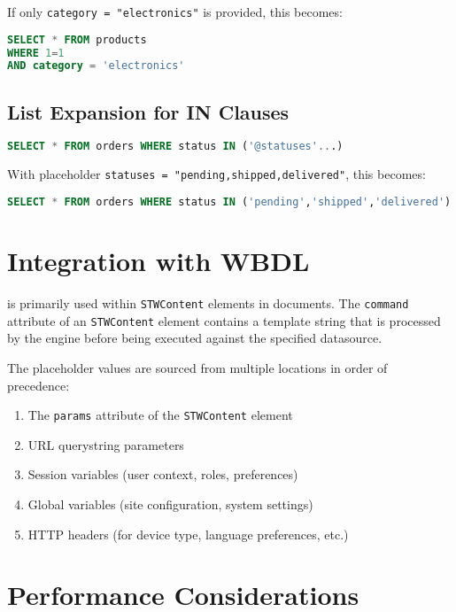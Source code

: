 If only \texttt{category = "electronics"} is provided, this becomes:
\begin{lstlisting}[language=SQL]
SELECT * FROM products 
WHERE 1=1 
AND category = 'electronics'
\end{lstlisting}

\subsection{List Expansion for IN Clauses}

\begin{lstlisting}[language=SQL,caption={WBPL List Expansion}]
SELECT * FROM orders WHERE status IN ('@statuses'...)
\end{lstlisting}

With placeholder \texttt{statuses = "pending,shipped,delivered"}, this becomes:
\begin{lstlisting}[language=SQL]
SELECT * FROM orders WHERE status IN ('pending','shipped','delivered')
\end{lstlisting}

\section{Integration with WBDL}
\label{sec:wbpl-integration}

\wbpl{} is primarily used within \texttt{STWContent} elements in \wbdl{} documents. The \texttt{command} attribute of an \texttt{STWContent} element contains a template string that is processed by the \wbpl{} engine before being executed against the specified datasource.

The placeholder values are sourced from multiple locations in order of precedence:
\begin{enumerate}
\item The \texttt{params} attribute of the \texttt{STWContent} element
\item URL querystring parameters
\item Session variables (user context, roles, preferences)
\item Global variables (site configuration, system settings)
\item HTTP headers (for device type, language preferences, etc.)
\end{enumerate}

\section{Performance Considerations}
\label{sec:wbpl-performance}

